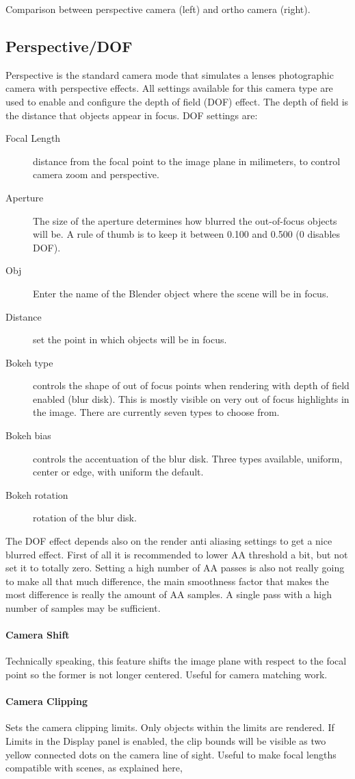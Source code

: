 Comparison between perspective camera (left) and ortho camera (right).
\subsection{Perspective/DOF}

Perspective is the standard camera mode that simulates a lenses photographic camera with perspective effects. All settings available for this camera type are used to enable and configure the depth of field (DOF) effect. The depth of field is the distance that objects appear in focus. DOF settings are:

\begin{description}
\item[Focal Length] distance from the focal point to the image plane in milimeters, to control camera zoom and perspective.
\item[Aperture] The size of the aperture determines how blurred the out-of-focus objects will be. A rule of thumb is to keep it between 0.100 and 0.500 (0 disables DOF).
\item[Obj] Enter the name of the Blender object where the scene will be in focus.
\item[Distance] set the point in which objects will be in focus.
\item[Bokeh type] controls the shape of out of focus points when rendering with depth of field enabled (blur disk). This is mostly visible on very out of focus highlights in the image. There are currently seven types to choose from.
\item[Bokeh bias] controls the accentuation of the blur disk. Three types available, uniform, center or edge, with uniform the default.
\item[Bokeh rotation] rotation of the blur disk.
\end{description}

The DOF effect depends also on the render anti aliasing settings to get a nice blurred effect. First of all it is recommended to lower AA threshold a bit, but not set it to totally zero. Setting a high number of AA passes is also not really going to make all that much difference, the main smoothness factor that makes the most difference is really the amount of AA samples. A single pass with a high number of samples may be sufficient.

\paragraph{Camera Shift}
Technically speaking, this feature shifts the image plane with respect to the focal point so the former is not longer centered. Useful for camera matching work.

\paragraph{Camera Clipping}
Sets the camera clipping limits. Only objects within the limits are rendered. If Limits in the Display panel is enabled, the clip bounds will be visible as two yellow connected dots on the camera line of sight. Useful to make focal lengths compatible with scenes, as explained here,
